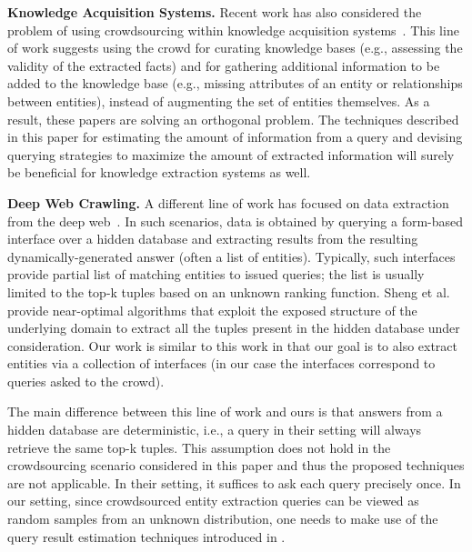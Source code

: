 \vspace{3pt}\noindent\textbf{Knowledge Acquisition Systems.} Recent work has also considered the problem of using crowdsourcing within knowledge acquisition systems~\cite{jiang:13, kondredi:2014, west:2014}. This line of work suggests using the crowd for curating knowledge bases (e.g., assessing the validity of the extracted facts) and for gathering additional information to be added to the knowledge base (e.g., missing attributes of an entity or relationships between entities), instead of augmenting the set of entities themselves. As a result, these papers are solving an orthogonal problem. The techniques described in this paper for estimating the amount of information from a query and devising querying strategies to maximize the amount of extracted information will surely be beneficial for knowledge extraction systems as well.

\vspace{3pt}\noindent\textbf{Deep Web Crawling.} A different line of work has focused on data extraction from the deep web~\cite{Jin:2011,Sheng:2012}. In such scenarios, data is obtained by querying a form-based interface over a hidden database and extracting results from the resulting dynamically-generated answer (often a list of entities). Typically, such interfaces provide partial list of matching entities to issued queries; the list is usually limited to the top-k tuples based on an unknown ranking function. Sheng et al.~\cite{Sheng:2012} provide near-optimal algorithms that exploit the exposed structure of the underlying domain to extract all the tuples present in the hidden database under consideration. Our work is similar to this work in that our goal is to also extract entities via a collection of interfaces (in our case the interfaces correspond to queries asked to the crowd).

The main difference between this line of work and ours is that answers from a hidden database are deterministic, i.e., a query in their setting will always retrieve the same top-k tuples. This assumption does not hold in the crowdsourcing scenario considered in this paper and thus the proposed techniques are not applicable. In their setting, it suffices to ask each query precisely once. In our setting, since crowdsourced entity extraction queries can be viewed as random samples from an unknown  distribution, one needs to make use of the query result estimation techniques introduced in .
